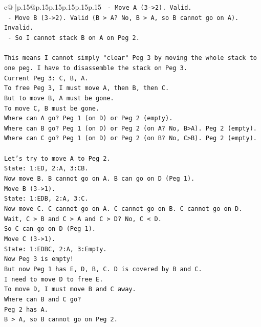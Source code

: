 \documentclass{article}
\begin{document}
{\begin{supertabular}{c@{$\;$}|p{.15\linewidth}@{}p{.15\linewidth}p{.15\linewidth}p{.15\linewidth}p{.15\linewidth}p{.15\linewidth}}
{{{\texttt{     {-} Move A (3{-}>2). Valid.} \\
\texttt{     {-} Move B (3{-}>2). Valid (B > A? No, B > A, so B cannot go on A). Invalid.} \\
\texttt{     {-} So I cannot stack B on A on Peg 2.} \\
\\ 
\texttt{This means I cannot simply "clear" Peg 3 by moving the whole stack to one peg. I have to disassemble the stack on Peg 3.} \\
\texttt{Current Peg 3: C, B, A.} \\
\texttt{To free Peg 3, I must move A, then B, then C.} \\
\texttt{But to move B, A must be gone.} \\
\texttt{To move C, B must be gone.} \\
\texttt{Where can A go? Peg 1 (on D) or Peg 2 (empty).} \\
\texttt{Where can B go? Peg 1 (on D) or Peg 2 (on A? No, B>A). Peg 2 (empty).} \\
\texttt{Where can C go? Peg 1 (on D) or Peg 2 (on B? No, C>B). Peg 2 (empty).} \\
\\ 
\texttt{Let's try to move A to Peg 2.} \\
\texttt{State: 1:ED, 2:A, 3:CB.} \\
\texttt{Now move B. B cannot go on A. B can go on D (Peg 1).} \\
\texttt{Move B (3{-}>1).} \\
\texttt{State: 1:EDB, 2:A, 3:C.} \\
\texttt{Now move C. C cannot go on A. C cannot go on B. C cannot go on D.} \\
\texttt{Wait, C > B and C > A and C > D? No, C < D.} \\
\texttt{So C can go on D (Peg 1).} \\
\texttt{Move C (3{-}>1).} \\
\texttt{State: 1:EDBC, 2:A, 3:Empty.} \\
\texttt{Now Peg 3 is empty!} \\
\texttt{But now Peg 1 has E, D, B, C. D is covered by B and C.} \\
\texttt{I need to move D to free E.} \\
\texttt{To move D, I must move B and C away.} \\
\texttt{Where can B and C go?} \\
\texttt{Peg 2 has A.} \\
\texttt{B > A, so B cannot go on Peg 2.} \\
}}}
\end{supertabular}}
\end{document}
